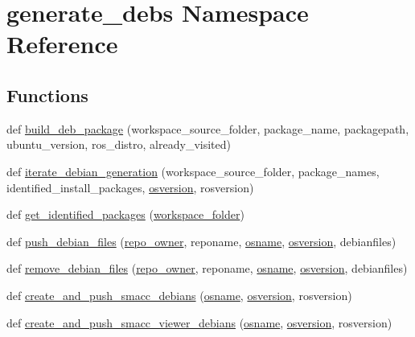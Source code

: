 \hypertarget{namespacegenerate__debs}{}\section{generate\+\_\+debs Namespace Reference}
\label{namespacegenerate__debs}
\subsection*{Functions}
\begin{DoxyCompactItemize}
\item 
def \hyperlink{namespacegenerate__debs_aa70c3f4917ddc57b13eaed8501f571a8}{build\+\_\+deb\+\_\+package} (workspace\+\_\+source\+\_\+folder, package\+\_\+name, packagepath, ubuntu\+\_\+version, ros\+\_\+distro, already\+\_\+visited)
\item 
def \hyperlink{namespacegenerate__debs_a2615a6fc7860b6aa9e920e6b4d886589}{iterate\+\_\+debian\+\_\+generation} (workspace\+\_\+source\+\_\+folder, package\+\_\+names, identified\+\_\+install\+\_\+packages, \hyperlink{namespacegenerate__debs_afd02fe6ead63bc5db5d3c3b9eb973b62}{osversion}, rosversion)
\item 
def \hyperlink{namespacegenerate__debs_aa91b87c6d9c3ed04015845cc9298431a}{get\+\_\+identified\+\_\+packages} (\hyperlink{namespacegenerate__debs_acb69863b90257249a30e43ebacfb8bd8}{workspace\+\_\+folder})
\item 
def \hyperlink{namespacegenerate__debs_a9b22f5ad65b40b7903c467eda308e575}{push\+\_\+debian\+\_\+files} (\hyperlink{namespacegenerate__debs_a74472455382c9d55ee0d75c6df6bde74}{repo\+\_\+owner}, reponame, \hyperlink{namespacegenerate__debs_ad06322332de29cb27a40152d0cccc2ca}{osname}, \hyperlink{namespacegenerate__debs_afd02fe6ead63bc5db5d3c3b9eb973b62}{osversion}, debianfiles)
\item 
def \hyperlink{namespacegenerate__debs_a08095040d038b3613ad0e77fd4e7f60e}{remove\+\_\+debian\+\_\+files} (\hyperlink{namespacegenerate__debs_a74472455382c9d55ee0d75c6df6bde74}{repo\+\_\+owner}, reponame, \hyperlink{namespacegenerate__debs_ad06322332de29cb27a40152d0cccc2ca}{osname}, \hyperlink{namespacegenerate__debs_afd02fe6ead63bc5db5d3c3b9eb973b62}{osversion}, debianfiles)
\item 
def \hyperlink{namespacegenerate__debs_af7237c463c8e5b4df369e6befc154c50}{create\+\_\+and\+\_\+push\+\_\+smacc\+\_\+debians} (\hyperlink{namespacegenerate__debs_ad06322332de29cb27a40152d0cccc2ca}{osname}, \hyperlink{namespacegenerate__debs_afd02fe6ead63bc5db5d3c3b9eb973b62}{osversion}, rosversion)
\item 
def \hyperlink{namespacegenerate__debs_a9a6167ed98fbdc7b1e1c56da5652cf19}{create\+\_\+and\+\_\+push\+\_\+smacc\+\_\+viewer\+\_\+debians} (\hyperlink{namespacegenerate__debs_ad06322332de29cb27a40152d0cccc2ca}{osname}, \hyperlink{namespacegenerate__debs_afd02fe6ead63bc5db5d3c3b9eb973b62}{osversion}, rosversion)
\end{DoxyCompactItemize}
